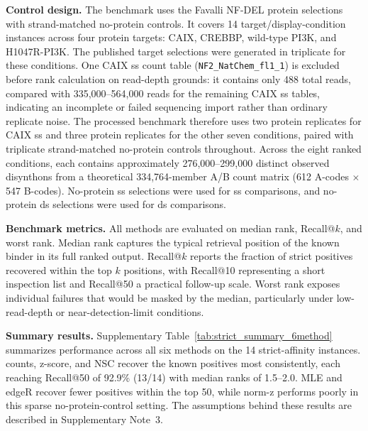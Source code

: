 \textbf{Control design.}
The benchmark uses the Favalli NF-DEL protein selections with strand-matched
no-protein controls. It covers 14 target/display-condition instances across
four protein targets: CAIX, CREBBP, wild-type PI3K, and H1047R-PI3K. The
published target selections were generated in triplicate for these conditions.
One CAIX ss count table (\texttt{NF2\_NatChem\_fl1\_1}) is excluded before rank
calculation on read-depth grounds: it contains only 488 total reads, compared
with 335,000--564,000 reads for the remaining CAIX ss tables, indicating an
incomplete or failed sequencing import rather than ordinary replicate noise.
The processed benchmark therefore uses two protein replicates for CAIX ss and
three protein replicates for the other seven conditions, paired with triplicate
strand-matched no-protein controls throughout. Across the eight ranked
conditions, each contains approximately 276,000--299,000 distinct observed
disynthons from a theoretical 334,764-member A/B count matrix (612 A-codes
$\times$ 547 B-codes). No-protein ss selections were used for ss comparisons,
and no-protein ds selections were used for ds comparisons.

\textbf{Benchmark metrics.}
All methods are evaluated on median rank, Recall@$k$, and worst rank. Median
rank captures the typical retrieval position of the known binder in its full
ranked output. Recall@$k$ reports the fraction of strict positives recovered
within the top $k$ positions, with Recall@10 representing a short inspection
list and Recall@50 a practical follow-up scale. Worst rank exposes individual
failures that would be masked by the median, particularly under low-read-depth
or near-detection-limit conditions.

\textbf{Summary results.}
Supplementary Table~\ref{tab:strict_summary_6method} summarizes performance across all six
methods on the 14 strict-affinity instances. \delthit{} counts,
\delthit{} z-score, and \deli{} NSC recover the known positives most
consistently, each reaching Recall@50 of 92.9\% (13/14) with median ranks of
1.5--2.0. \deli{} MLE and \delthit{} edgeR recover fewer positives
within the top 50, while \deli{} norm-z performs poorly in this sparse
no-protein-control setting. The assumptions behind these results are described
in Supplementary Note~3.

